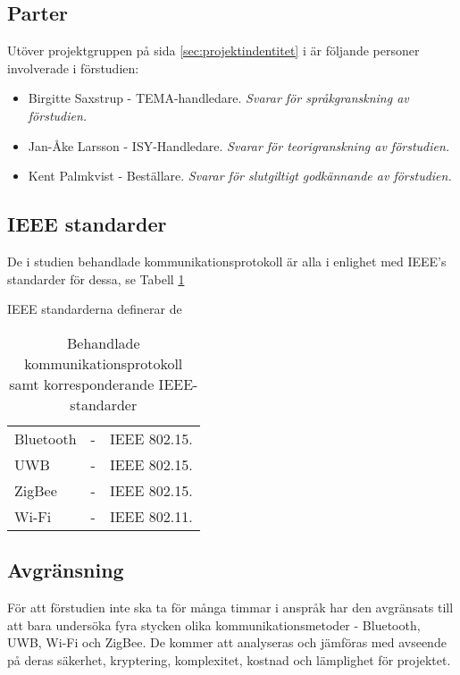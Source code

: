 \documentclass[11pt]{article}
\begin{document}
\begin{flushleft}
\subsection{Parter}
Utöver projektgruppen på sida \ref{sec:projektindentitet} i är följande personer involverade i förstudien:
\begin{itemize}
\item Birgitte Saxstrup - TEMA-handledare. \textit{Svarar för språkgranskning av förstudien.}
\item Jan-Åke Larsson - ISY-Handledare. \textit{Svarar för teorigranskning av förstudien.}
\item Kent Palmkvist - Beställare. \textit{Svarar för slutgiltigt godkännande av förstudien.}
\end{itemize}

\subsection{IEEE standarder}
De i studien behandlade kommunikationsprotokoll är alla i enlighet med IEEE's standarder för dessa, se Tabell \ref{tab:IEEE-standarder} \\\bigskip

IEEE standarderna definerar de 
\\\bigskip

\begin{table}[h]
\centering
\begin{tabular}{lcl}
 Bluetooth &
 -&
 IEEE 802.15.\\
 
 UWB &
 -&
 IEEE 802.15.\\
 
 ZigBee &
 -&
 IEEE 802.15.\\
 
 Wi-Fi &
 -&
 IEEE 802.11.\\
 

\end{tabular}
\caption{Behandlade kommunikationsprotokoll samt korresponderande IEEE-standarder}
\label{tab:IEEE-standarder}
\end{table}


\subsection{Avgränsning}
\label{sec:Avgränsning}
För att förstudien inte ska ta för många timmar i anspråk har den avgränsats till att bara undersöka fyra stycken olika kommunikationsmetoder - Bluetooth, UWB, Wi-Fi och ZigBee. De kommer att analyseras och jämföras med avseende på deras säkerhet, kryptering, komplexitet, kostnad och lämplighet för projektet.


\end{flushleft}
\end{document}
